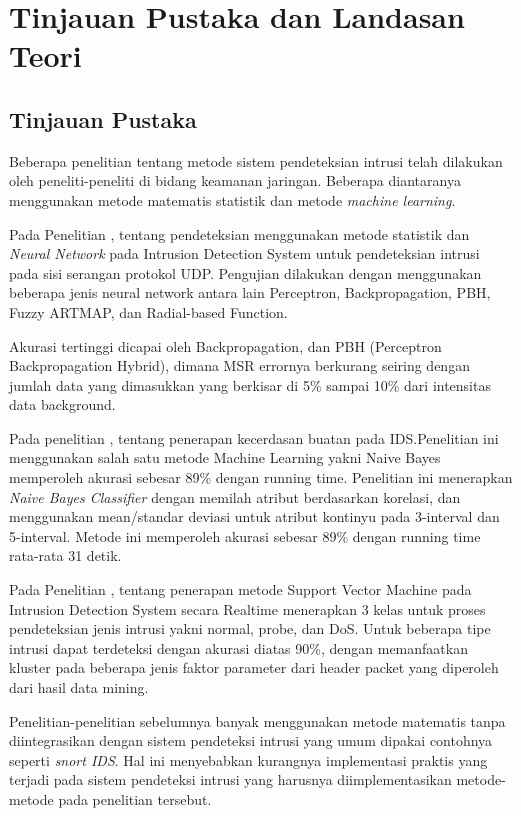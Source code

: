 \documentclass[./skripsi.tex]{subfiles}
\begin{document}
\chapter{Tinjauan Pustaka dan Landasan Teori}

\section{Tinjauan Pustaka}\label{bab2:tinjauanpustaka}
\par Beberapa penelitian tentang metode sistem pendeteksian intrusi telah dilakukan oleh peneliti-peneliti di bidang keamanan jaringan. Beberapa diantaranya menggunakan metode matematis statistik dan metode \textit{machine learning}.
\par Pada Penelitian \cite{zhang2001hide}, tentang pendeteksian menggunakan metode statistik dan  \textit{Neural Network} pada Intrusion Detection System untuk pendeteksian intrusi pada sisi serangan protokol UDP. Pengujian dilakukan dengan menggunakan beberapa jenis neural network antara lain Perceptron, Backpropagation, PBH, Fuzzy ARTMAP, dan Radial-based Function.
\par Akurasi tertinggi dicapai oleh Backpropagation, dan PBH (Perceptron Backpropagation Hybrid), dimana MSR errornya berkurang seiring dengan jumlah data yang dimasukkan yang berkisar di 5\% sampai 10\% dari intensitas data background.
\par Pada penelitian \cite{wirawan2015penerapan}, tentang penerapan kecerdasan buatan pada IDS.Penelitian ini menggunakan salah satu metode Machine Learning yakni Naive Bayes memperoleh akurasi sebesar 89\% dengan running time. Penelitian ini menerapkan \textit{Naive Bayes Classifier} dengan memilah atribut berdasarkan korelasi, dan menggunakan mean/standar deviasi untuk atribut kontinyu pada 3-interval dan 5-interval. Metode ini memperoleh akurasi sebesar 89\% dengan running time rata-rata 31 detik.
\par Pada Penelitian \cite{jacobus2014penerapan}, tentang penerapan metode Support Vector Machine pada Intrusion Detection System secara Realtime menerapkan 3 kelas untuk proses pendeteksian jenis intrusi yakni normal, probe, dan DoS. Untuk beberapa tipe intrusi dapat terdeteksi dengan akurasi diatas 90\%, dengan memanfaatkan kluster pada beberapa jenis faktor parameter dari header packet yang diperoleh dari hasil data mining.
\par Penelitian-penelitian sebelumnya banyak menggunakan metode matematis tanpa diintegrasikan dengan sistem pendeteksi intrusi yang umum dipakai contohnya seperti \textit{snort IDS}. Hal ini menyebabkan kurangnya implementasi praktis yang terjadi pada sistem pendeteksi intrusi yang harusnya diimplementasikan metode-metode pada penelitian tersebut.
\end{document}
